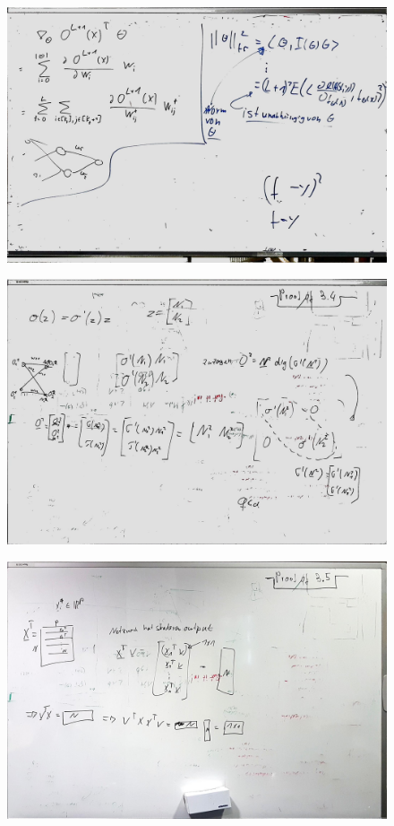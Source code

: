 \documentclass[a4paper]{article}
\begin{document}
\begin{figure}[htb]
	\centering
\includegraphics[width=\textwidth]{whiteboard_notes/08.jpg}
\end{figure}

\begin{figure}[htb]
	\centering
	\includegraphics[width=\textwidth]{whiteboard_notes/09.jpg}
\end{figure}

\begin{figure}[htb]
	\centering
	\includegraphics[width=\textwidth]{whiteboard_notes/10.jpg}
\end{figure}
\end{document}
